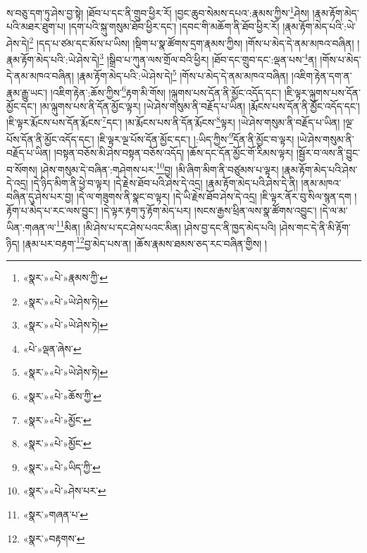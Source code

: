 ས་བཅུ་དག་ཏུ་ཤེས་བྱ་སྟེ། །ཐོབ་པ་དང་ནི་གྲུབ་ཕྱིར་རོ། །བྱང་ཆུབ་སེམས་དཔའ་:རྣམས་ཀྱིས་\footnote{«སྣར་»«པེ་»རྣམས་ཀྱི་}ཤེས། །རྣམ་རྟོག་མེད་པའི་མཐར་ཐུག་པ། །དག་པའི་སྐུ་གསུམ་ཐོབ་ཕྱིར་དང་། །དབང་གི་མཆོག་ནི་ཐོབ་ཕྱིར་རོ། །རྣམ་རྟོག་མེད་པའི་:ཡེ་ཤེས་དེ།\footnote{«སྣར་»«པེ་»ཡེ་ཤེས་ཏེ།} །དད་པ་ཙམ་དང་མོས་པ་ཡིས། །སྡིག་པ་སྣ་ཚོགས་དྲག་རྣམས་ཀྱིས། །གོས་པ་མེད་དེ་ནམ་མཁའ་བཞིན། །རྣམ་རྟོག་མེད་པའི་:ཡེ་ཤེས་དེ།\footnote{«སྣར་»«པེ་»ཡེ་ཤེས་ཏེ།} །སྒྲིབ་པ་ཀུན་ལས་གྲོལ་བའི་ཕྱིར། །ཐོབ་དང་གྲུབ་དང་:ལྡན་པས་\footnote{«པེ་»ལྡན་ཞེས་}ན། །གོས་པ་མེད་དེ་ནམ་མཁའ་བཞིན། །རྣམ་རྟོག་མེད་པའི་:ཡེ་ཤེས་དེ།\footnote{«སྣར་»«པེ་»ཡེ་ཤེས་ཏེ།} །གོས་པ་མེད་དེ་ནམ་མཁའ་བཞིན། །འཇིག་རྟེན་དག་ན་རྣམ་རྒྱུ་ཡང་། །འཇིག་རྟེན་:ཆོས་ཀྱིས་\footnote{«སྣར་»«པེ་»ཆོས་ཀྱི་}རྟག་མི་གོས། །ལྐུགས་པས་དོན་ནི་མྱོང་འདོད་དང་། །ཇི་ལྟར་ལྐུགས་པས་དོན་མྱོང་དང་། །མ་ལྐུགས་པས་ནི་དོན་མྱོང་ལྟར། །ཡེ་ཤེས་གསུམ་ནི་བརྗོད་པ་ཡིན། །རྨོངས་པས་དོན་ནི་མྱོང་འདོད་དང་། །ཇི་ལྟར་རྨོངས་པས་དོན་རྨོངས་\footnote{«སྣར་»«པེ་»མྱོང་}དང་། །མ་རྨོངས་པས་ནི་དོན་རྨོངས་\footnote{«སྣར་»«པེ་»མྱོང་}ལྟར། །ཡེ་ཤེས་གསུམ་ནི་བརྗོད་པ་ཡིན། །ལྔ་པོས་དོན་ནི་མྱོང་འདོད་དང་། །ཇི་ལྟར་ལྔ་པོས་དོན་མྱོང་དང་། །:ཡིད་ཀྱིས་\footnote{«སྣར་»«པེ་»ཡིད་ཀྱི་}དོན་ནི་མྱོང་བ་ལྟར། །ཡེ་ཤེས་གསུམ་ནི་བརྗོད་པ་ཡིན། །བསྟན་བཅོས་མི་ཤེས་བསྟན་བཅོས་འདོད། །ཆོས་དང་དོན་མྱོང་གོ་རིམས་ལྟར། །སྦྱོར་བ་ལས་ནི་བྱུང་བ་སོགས། །ཤེས་གསུམ་དེ་བཞིན་:གཤེགས་པར་\footnote{«སྣར་»«པེ་»ཤེས་པར་}བྱ། །མི་ཞིག་མིག་ནི་བཙུམས་པ་ལྟར། །རྣམ་རྟོག་མེད་པའི་ཤེས་དེ་འདྲ། །དེ་ཉིད་མིག་ནི་ཕྱེ་བ་ལྟར། །དེ་རྗེས་ཐོབ་པའི་ཤེས་དེ་འདྲ། །རྣམ་རྟོག་མེད་པའི་ཤེས་དེ་ནི། །ནམ་མཁའ་བཞིན་དུ་ཤེས་པར་བྱ། །དེ་ལ་གཟུགས་ནི་སྣང་བ་ལྟར། །དེ་ཡི་རྗེས་ཐོབ་ཤེས་དེ་འདྲ། །ཇི་ལྟར་ནོར་བུ་སིལ་སྙན་དག །རྟོག་པ་མེད་པ་རང་ལས་བྱུང་། །དེ་ལྟར་རྟག་ཏུ་རྟོག་མེད་པར། །སངས་རྒྱས་ཕྲིན་ལས་སྣ་ཚོགས་འབྱུང་། །དེ་ལ་མ་ཡིན་:གཞན་ལ་\footnote{«སྣར་»གཞན་པ་}མིན། །མི་ཤེས་པ་དང་ཤེས་པའང་མིན། །ཤེས་བྱ་དང་ནི་ཁྱད་མེད་པའི། །ཤེས་གང་དེ་ནི་མི་རྟོག་ཉིད། །རྣམ་པར་བརྟག་\footnote{«སྣར་»བརྟགས་}བྱ་མེད་པས་ན། །ཆོས་རྣམས་ཐམས་ཅད་རང་བཞིན་གྱིས། །
